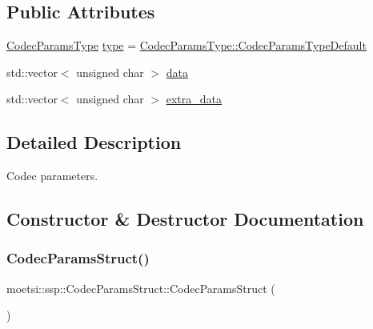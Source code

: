 \subsection*{Public Attributes}
\begin{DoxyCompactItemize}
\item 
\hyperlink{namespacemoetsi_1_1ssp_a6d638ba0bd38e9daded08f633d893563}{Codec\+Params\+Type} \hyperlink{structmoetsi_1_1ssp_1_1CodecParamsStruct_a94a427a8907bb5a23c4f6ee2117a4803}{type} = \hyperlink{namespacemoetsi_1_1ssp_a6d638ba0bd38e9daded08f633d893563a1ffd3a6c06641b95d3e5142403ed0730}{Codec\+Params\+Type\+::\+Codec\+Params\+Type\+Default}
\item 
std\+::vector$<$ unsigned char $>$ \hyperlink{structmoetsi_1_1ssp_1_1CodecParamsStruct_a23aa918989011a025ddc24a7e2e8cf70}{data}
\item 
std\+::vector$<$ unsigned char $>$ \hyperlink{structmoetsi_1_1ssp_1_1CodecParamsStruct_a709ed326f505393910eece3dc6887605}{extra\+\_\+data}
\end{DoxyCompactItemize}


\subsection{Detailed Description}
Codec parameters. 

\subsection{Constructor \& Destructor Documentation}
\mbox{\label{structmoetsi_1_1ssp_1_1CodecParamsStruct_ae2d0f15ae18885a73ac37cf51c78abf4}} 
\subsubsection{\texorpdfstring{Codec\+Params\+Struct()}{CodecParamsStruct()}\hspace{0.1cm}{\footnotesize\ttfamily [1/4]}}
{\footnotesize\ttfamily moetsi\+::ssp\+::\+Codec\+Params\+Struct\+::\+Codec\+Params\+Struct (\begin{DoxyParamCaption}{ }\end{DoxyParamCaption})\hspace{0.3cm}{\ttfamily [inline]}}

